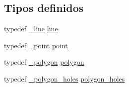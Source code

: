 \subsection*{Tipos definidos}
\begin{CompactItemize}
\item 
typedef \hyperlink{struct__line}{\_\-line} \hyperlink{group__geometry_gbb4d6a1464226fe9b7c0d80348e5eb98_gbb4d6a1464226fe9b7c0d80348e5eb98}{line}
\item 
typedef \hyperlink{struct__point}{\_\-point} \hyperlink{group__geometry_g37e9de632d1eb76ff7dcd3d8172add7d_g37e9de632d1eb76ff7dcd3d8172add7d}{point}
\item 
typedef \hyperlink{struct__polygon}{\_\-polygon} \hyperlink{group__geometry_g9169f21a34d344b356c44948943e99cc_g9169f21a34d344b356c44948943e99cc}{polygon}
\item 
typedef \hyperlink{struct__polygon__holes}{\_\-polygon\_\-holes} \hyperlink{group__geometry_g1137695e6ed0a9b25685f8bf3ccdb45f_g1137695e6ed0a9b25685f8bf3ccdb45f}{polygon\_\-holes}
\end{CompactItemize}
